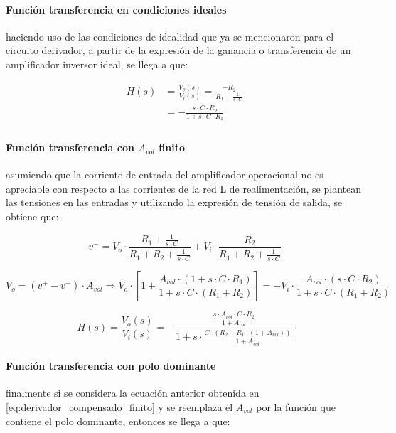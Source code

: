 \paragraph*{Funci\'on transferencia en condiciones ideales} haciendo uso de las condiciones de idealidad que ya se mencionaron para el circuito derivador, a partir de la expresi\'on de la ganancia o transferencia de un amplificador inversor ideal, se llega a que:

\begin{align*}
		H(s) & = \frac{V_o(s)}{V_i(s)} = \frac{-R_2}{R_1 + \frac{1}{s \cdot C}} \\
		& = - \frac{s \cdot C \cdot R_2}{1 + s \cdot C \cdot R_1} \\
\end{align*}

\paragraph*{Funci\'on transferencia con $A_{vol}$ finito} asumiendo que la corriente de entrada del amplificador operacional no es apreciable con respecto a las corrientes de la red L de realimentaci\'on, se plantean las tensiones en las entradas y utilizando la expresi\'on de tensi\'on de salida, se obtiene que:

\begin{equation*}
	v^{-} = V_o \cdot \frac{R_1 + \frac{1}{s \cdot C}}{R_1 + R_2 + \frac{1}{s \cdot C}} + V_i \cdot \frac{R_2}{R_1+ R_2 + \frac{1}{s \cdot C}}
\end{equation*}

\begin{equation*}
	V_o = (v^{+} - v^{-}) \cdot A_{vol} \Rightarrow
	V_o \cdot \left[ 1 + \frac{A_{vol} \cdot (1 + s \cdot C \cdot R_1)}{1 + s \cdot C \cdot (R_1 + R_2)} \right] =
	- V_i \cdot \frac{A_{vol} \cdot (s \cdot C \cdot R_2)}{1 + s \cdot C \cdot (R_1 + R_2)}
\end{equation*}

\begin{equation}
	H(s) = \frac{V_o(s)}{V_i(s)} = - \frac{\frac{s \cdot A_{vol} \cdot C \cdot R_2}{1 + A_{vol}}}{1 + s \cdot \frac{C \cdot (R_2 + R_1 \cdot(1 + A_{vol}))}{1 + A_{vol}}}
	\label{eq:derivador_compensado_finito}
\end{equation}

\paragraph*{Funci\'on transferencia con polo dominante} finalmente si se considera la ecuaci\'on anterior obtenida en \ref{eq:derivador_compensado_finito} y se reemplaza el $A_{vol}$ por la funci\'on que contiene el polo dominante, entonces se llega a que:

